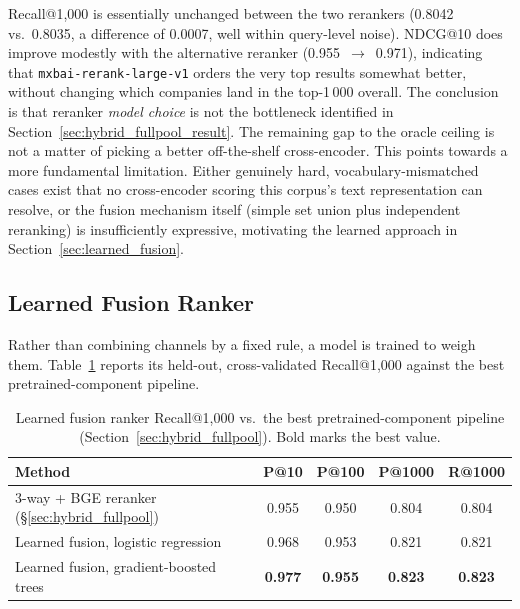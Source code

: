 \documentclass[a4paper,oneside,bibliography=totoc]{scrbook}
\begin{document}
Recall@1{,}000 is essentially unchanged between the two rerankers (0.8042 vs.\ 0.8035, a difference of 0.0007, well within query-level noise). NDCG@10 does improve modestly with the alternative reranker (0.955~$\to$~0.971), indicating that \texttt{mxbai-rerank-large-v1} orders the very top results somewhat better, without changing which companies land in the top-1\,000 overall. The conclusion is that reranker \emph{model choice} is not the bottleneck identified in Section~\ref{sec:hybrid_fullpool_result}. The remaining gap to the oracle ceiling is not a matter of picking a better off-the-shelf cross-encoder. This points towards a more fundamental limitation. Either genuinely hard, vocabulary-mismatched cases exist that no cross-encoder scoring this corpus's text representation can resolve, or the fusion mechanism itself (simple set union plus independent reranking) is insufficiently expressive, motivating the learned approach in Section~\ref{sec:learned_fusion}.

\subsection{Learned Fusion Ranker}
\label{sec:learned_fusion_result}

Rather than combining channels by a fixed rule, a model is trained to weigh them. Table~\ref{tab:learned_fusion} reports its held-out, cross-validated Recall@1{,}000 against the best pretrained-component pipeline.

\begin{table}[ht]
\centering
\caption{Learned fusion ranker Recall@1{,}000 vs.\ the best pretrained-component pipeline (Section~\ref{sec:hybrid_fullpool}). Bold marks the best value.}
\label{tab:learned_fusion}
\small
\setlength{\tabcolsep}{2.5pt}
\begin{tabular}{lcccc}
\toprule
\textbf{Method} & \textbf{P@10} & \textbf{P@100} & \textbf{P@1000} & \textbf{R@1000} \\
\midrule
3-way + BGE reranker (\S\ref{sec:hybrid_fullpool}) & 0.955 & 0.950 & 0.804          & 0.804          \\
Learned fusion, logistic regression                  & 0.968 & 0.953 & 0.821          & 0.821          \\
Learned fusion, gradient-boosted trees                & \textbf{0.977} & \textbf{0.955} & \textbf{0.823} & \textbf{0.823} \\
\bottomrule
\end{tabular}
\normalsize
\end{table}
\end{document}
